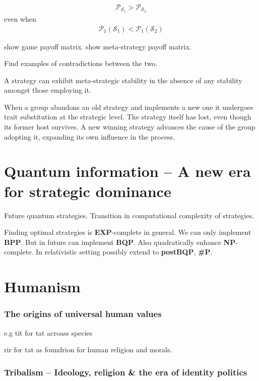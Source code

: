 \documentclass[twocolumn, aps, rmp, amsmath, amssymb, nofootinbib, superscriptaddress, longbibliography, floatfix, table-of-contents, eqsecnum]{revtex4-1}
\begin{document}
\begin{align}
\mathcal{P}_{\mathcal{S}_1} > \mathcal{P}_{\mathcal{S}_2}	
\end{align}
even when
\begin{align}
\mathcal{P}_1(\mathcal{S}_1) < \mathcal{P}_1(\mathcal{S}_2)
\end{align}

show game payoff matrix. show meta-strategy payoff matrix.

Find examples of contradictions between the two.

A strategy can exhibit meta-strategic stability in the absence of any stability amongst those employing it.

When a group abandons an old strategy and implements a new one it undergoes trait substitution at the strategic level. The strategy itself has lost, even though its former host survives. A new winning strategy advances the cause of the group adopting it, expanding its own influence in the process.

%
%

\part{Quantum information -- A new era for strategic dominance}

Future quantum strategies. Transition in computational complexity of strategies.

Finding optimal strategies is \textbf{EXP}-complete in general. We can only implement \textbf{BPP}. But in future can implement \textbf{BQP}. Also quadratically enhance \textbf{NP}-complete. In relativistic setting possibly extend to \textbf{postBQP}, \textbf{\#P}.

%
%

\part{Humanism}

\section{The origins of universal human values}

e.g tit for tat acroass species

rir for tat as foundrion for human religion and morals.

\section{Tribalism -- Ideology, religion \& the era of identity politics}
\end{document}
